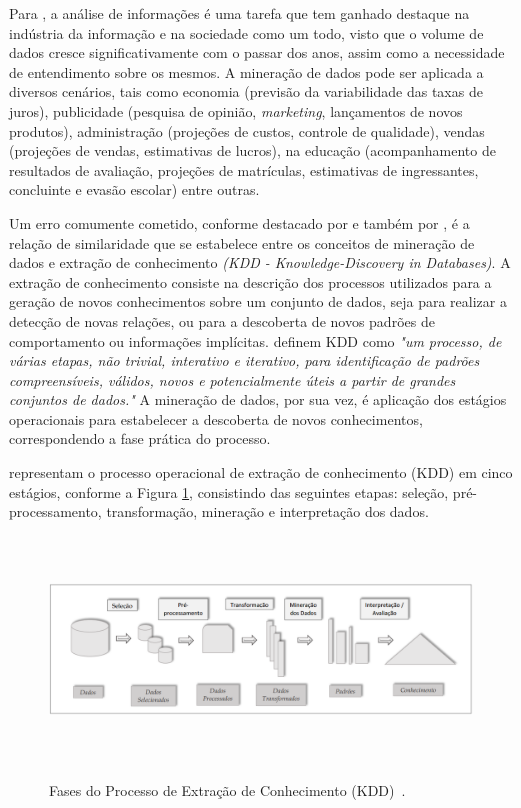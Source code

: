 Para \citet{han_kamber2006}, a análise de informações é uma tarefa que tem ganhado destaque na indústria da informação e na sociedade como um todo, visto que o volume de dados cresce significativamente com o passar dos anos, assim como a necessidade de entendimento sobre os mesmos. A mineração de dados pode ser aplicada a diversos cenários, tais como economia (previsão da variabilidade das taxas de juros), publicidade (pesquisa de opinião, \textit{marketing}, lançamentos de novos produtos), administração (projeções de custos, controle de qualidade), vendas (projeções de vendas, estimativas de lucros), na educação (acompanhamento de resultados de avaliação, projeções de matrículas, estimativas de ingressantes, concluinte e evasão escolar) entre outras. 

Um erro comumente cometido, conforme destacado por \citet{palmeira_santos2014} e também por \citet{cardoso_machado2008}, é a relação de similaridade que se estabelece entre os conceitos de mineração de dados e extração de conhecimento \textit{(KDD - Knowledge-Discovery in Databases)}. A extração de conhecimento consiste na descrição dos processos utilizados para a geração de novos conhecimentos sobre um conjunto de dados, seja para realizar a detecção de novas relações, ou para a descoberta de novos padrões de comportamento ou informações implícitas. \citet[p. 22 \textit{apud} \citet{fayyad1996}]{macedo_matos2010} definem KDD como \textit{"um processo, de várias etapas, não trivial, interativo e iterativo, para identificação de padrões compreensíveis, válidos, novos e potencialmente úteis a partir de grandes conjuntos de dados."} A mineração de dados, por sua vez, é aplicação dos estágios operacionais para estabelecer a descoberta de novos conhecimentos, correspondendo a fase prática do processo.

\citet{fayyad1996} representam o processo operacional de extração de conhecimento (KDD) em cinco estágios, conforme a Figura \ref{fayaad_kdd}, consistindo das seguintes etapas: seleção, pré-processamento, transformação, mineração e interpretação dos dados. 

\begin{figure}[!htb]
\centering
{\includegraphics[width=16cm, height=6cm]{images/fases-kdd}}
\caption {Fases do Processo de Extração de Conhecimento (KDD)~\cite{fayyad1996}.}
\label{fayaad_kdd}
\end{figure}

